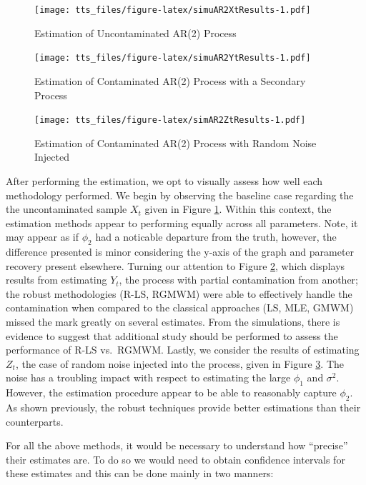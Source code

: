 \documentclass[]{book}
\theoremstyle{definition}
\theoremstyle{definition}
\theoremstyle{definition}
\theoremstyle{remark}
\begin{document}
{\begin{figure}
\centering
\texttt{[image: tts\_files/figure-latex/simuAR2XtResults-1.pdf]}
\caption{\label{fig:simuAR2XtResults}Estimation of Uncontaminated AR(2)
Process}
\end{figure}

\begin{figure}
\centering
\texttt{[image: tts\_files/figure-latex/simuAR2YtResults-1.pdf]}
\caption{\label{fig:simuAR2YtResults}Estimation of Contaminated AR(2)
Process with a Secondary Process}
\end{figure}

\begin{figure}
\centering
\texttt{[image: tts\_files/figure-latex/simAR2ZtResults-1.pdf]}
\caption{\label{fig:simAR2ZtResults}Estimation of Contaminated AR(2) Process
with Random Noise Injected}
\end{figure}

After performing the estimation, we opt to visually assess how well each
methodology performed. We begin by observing the baseline case regarding
the the uncontaminated sample \(X_t\) given in Figure
\ref{fig:simuAR2XtResults}. Within this context, the estimation methods
appear to performing equally across all parameters. Note, it may appear
as if \(\phi_2\) had a noticable departure from the truth, however, the
difference presented is minor considering the y-axis of the graph and
parameter recovery present elsewhere. Turning our attention to Figure
\ref{fig:simuAR2YtResults}, which displays results from estimating
\(Y_t\), the process with partial contamination from another; the robust
methodologies (R-LS, RGMWM) were able to effectively handle the
contamination when compared to the classical approaches (LS, MLE, GMWM)
missed the mark greatly on several estimates. From the simulations,
there is evidence to suggest that additional study should be performed
to assess the performance of R-LS vs.~RGMWM. Lastly, we consider the
results of estimating \(Z_t\), the case of random noise injected into
the process, given in Figure \ref{fig:simAR2ZtResults}. The noise has a
troubling impact with respect to estimating the large \(\phi_1\) and
\(\sigma^2\). However, the estimation procedure appear to be able to
reasonably capture \(\phi_2\). As shown previously, the robust
techniques provide better estimations than their counterparts.

For all the above methods, it would be necessary to understand how
``precise'' their estimates are. To do so we would need to obtain
confidence intervals for these estimates and this can be done mainly in
two manners:

}
\end{document}
